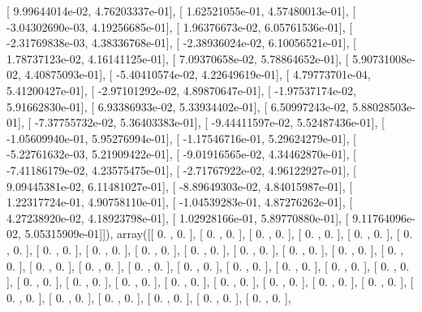 \documentclass{article}
\begin{document}
       [  9.99644014e-02,   4.76203337e-01],
       [  1.62521055e-01,   4.57480013e-01],
       [ -3.04302690e-03,   4.19256685e-01],
       [  1.96376673e-02,   6.05761536e-01],
       [ -2.31769838e-03,   4.38336768e-01],
       [ -2.38936024e-02,   6.10056521e-01],
       [  1.78737123e-02,   4.16141125e-01],
       [  7.09370658e-02,   5.78864652e-01],
       [  5.90731008e-02,   4.40875093e-01],
       [ -5.40410574e-02,   4.22649619e-01],
       [  4.79773701e-04,   5.41200427e-01],
       [ -2.97101292e-02,   4.89870647e-01],
       [ -1.97537174e-02,   5.91662830e-01],
       [  6.93386933e-02,   5.33934402e-01],
       [  6.50997243e-02,   5.88028503e-01],
       [ -7.37755732e-02,   5.36403383e-01],
       [ -9.44411597e-02,   5.52487436e-01],
       [ -1.05609940e-01,   5.95276994e-01],
       [ -1.17546716e-01,   5.29624279e-01],
       [ -5.22761632e-03,   5.21909422e-01],
       [ -9.01916565e-02,   4.34462870e-01],
       [ -7.41186179e-02,   4.23575475e-01],
       [ -2.71767922e-02,   4.96122927e-01],
       [  9.09445381e-02,   6.11481027e-01],
       [ -8.89649303e-02,   4.84015987e-01],
       [  1.22317724e-01,   4.90758110e-01],
       [ -1.04539283e-01,   4.87276262e-01],
       [  4.27238920e-02,   4.18923798e-01],
       [  1.02928166e-01,   5.89770880e-01],
       [  9.11764096e-02,   5.05315909e-01]]), array([[ 0.        ,  0.        ],
       [ 0.        ,  0.        ],
       [ 0.        ,  0.        ],
       [ 0.        ,  0.        ],
       [ 0.        ,  0.        ],
       [ 0.        ,  0.        ],
       [ 0.        ,  0.        ],
       [ 0.        ,  0.        ],
       [ 0.        ,  0.        ],
       [ 0.        ,  0.        ],
       [ 0.        ,  0.        ],
       [ 0.        ,  0.        ],
       [ 0.        ,  0.        ],
       [ 0.        ,  0.        ],
       [ 0.        ,  0.        ],
       [ 0.        ,  0.        ],
       [ 0.        ,  0.        ],
       [ 0.        ,  0.        ],
       [ 0.        ,  0.        ],
       [ 0.        ,  0.        ],
       [ 0.        ,  0.        ],
       [ 0.        ,  0.        ],
       [ 0.        ,  0.        ],
       [ 0.        ,  0.        ],
       [ 0.        ,  0.        ],
       [ 0.        ,  0.        ],
       [ 0.        ,  0.        ],
       [ 0.        ,  0.        ],
       [ 0.        ,  0.        ],
       [ 0.        ,  0.        ],
       [ 0.        ,  0.        ],
       [ 0.        ,  0.        ],
       [ 0.        ,  0.        ],
       [ 0.        ,  0.        ],
       [ 0.        ,  0.        ],
       [ 0.        ,  0.        ],
\end{document}
